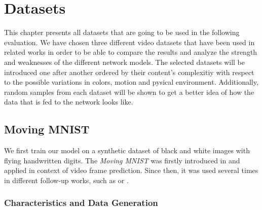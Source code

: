 
\chapter{Datasets} \label{chapter:datasets}

This chapter presents all datasets that are going to be used in the following evaluation. We have chosen three different video datasets that have been used in related works in order to be able to compare the results and analyze the strength and weaknesses of the different network models. The selected datasets will be introduced one after another ordered by their content's complexitiy with respect to the possible variations in colors, motion and pysical environment. Additionally, random samples from each dataset will be shown to get a better idea of how the data that is fed to the network looks like.


\section{Moving MNIST}


We first train our model on a synthetic dataset of black and white images with flying handwritten digits. The \textit{Moving MNIST} was firstly introduced in \parencite{unsup_learn_lstm} and applied in context of video frame prediction. Since then, it was used several times in different follow-up works, such as \parencite{spat_temp_video_autoenc} or \parencite{conv_lstm_nowcasting}. 

\subsection{Characteristics and Data Generation}

